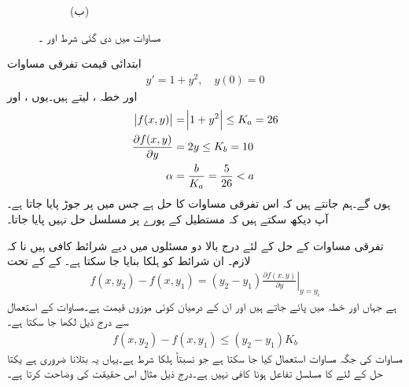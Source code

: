 \begin{figure}
\begin{subfigure}{0.5\textwidth}
\caption*{(ب)}
\end{subfigure}%
\caption{مساوات  میں دی گئی شرط اور ۔}
\label{شکل_سادہ_اول_مستطیل_ثبوت}
\end{figure}

ابتدائی قیمت تفرقی مساوات
\begin{align*}
y'=1+y^2,\quad y(0)=0
\end{align*}
اور خطہ ،  لیتے ہیں۔یوں ،   اور
\begin{align*}
\abs{f(x,y)}&=\abs{1+y^2}\le K_a=26\\
\frac{\partial f(x,y)}{\partial y}&=2y \le K_b=10\\
\alpha&=\frac{b}{K_a}=\frac{5}{26}< a
\end{align*}
ہوں گے۔ہم جانتے ہیں کہ اس تفرقی مساوات کا حل  ہے جس میں  پر جوڑ پایا جاتا ہے۔آپ دیکھ سکتے ہیں کہ مستطیل کے پورے  پر مسلسل حل نہیں پایا جاتا۔

تفرقی مساوات کے حل کے لئے درج بالا دو مسئلوں میں دیے شرائط کافی ہیں نا کہ لازم۔ ان شرائط کو ہلکا بنایا جا سکتا ہے۔  کے  کے تحت
\begin{align*}
f(x,y_2)-f(x,y_1)=(y_2-y_1)\left. \frac{\partial f(x,y)}{\partial y}\right|_{y=y_{i}}
\end{align*}
ہے جہاں  اور  خطہ  میں پائے جاتے ہیں اور  ان کے درمیان کوئی  موزوں قیمت ہے۔مساوات  کے استعمال سے درج ذیل لکھا جا سکتا ہے۔
\begin{align}\label{مساوات_سادہ_اول_وجودیت_ث}
f(x,y_2)-f(x,y_1) \le (y_2-y_1) K_b
\end{align}
مساوات  کی جگہ  مساوات  استعمال کیا جا سکتا ہے جو نسبتاً ہلکا شرط ہے۔یہاں یہ بتلانا ضروری ہے یکتا حل کے لئے  کا مسلسل تفاعل ہونا کافی نہیں ہے۔درج ذیل مثال اس حقیقت کی وضاحت کرتا ہے۔

